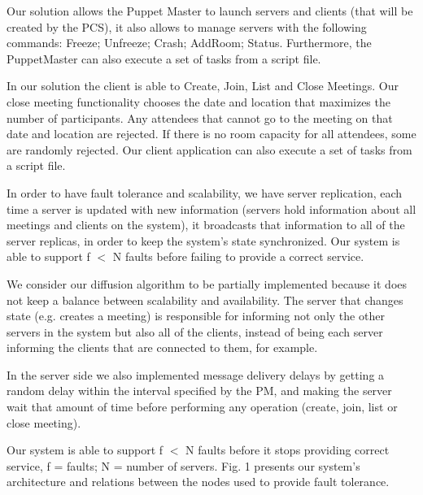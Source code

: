\documentclass[times, 10pt, twocolumn]{article}
\begin{document}

Our solution allows the Puppet Master to launch servers and clients (that will be created by the PCS), it also allows to manage servers with the following commands: Freeze; Unfreeze; Crash; AddRoom; Status.
Furthermore, the PuppetMaster can also execute a set of tasks from a script file.


In our solution the client is able to Create, Join, List and Close Meetings.
Our close meeting functionality chooses the date and location that maximizes the number of participants. Any attendees that cannot go to the meeting on that date and location are rejected. If there is no room capacity for all attendees, some are randomly rejected. Our client application can also execute a set of tasks from a script file.


In order to have fault tolerance and scalability, we have server replication, each time a server is updated with new information (servers hold information about all meetings and clients on the system), it broadcasts that information to all of the server replicas, in order to keep the system's state synchronized.
Our system is able to support f $<$ N faults before failing to provide a correct service.

We consider our diffusion algorithm to be partially implemented because it does not keep a balance between scalability and availability. The server that changes state (e.g. creates a meeting) is responsible for informing not only the other servers in the system but also all of the clients, instead of being each server informing the clients that are connected to them, for example.

In the server side we also implemented message delivery delays by getting a random delay within the interval specified by the PM, and making the server wait that amount of time before performing any operation (create, join, list or close meeting).

Our system is able to support f $<$ N faults before it stops providing correct service, f = faults; N = number of servers. Fig. 1 presents our system's architecture and relations between the nodes used to provide fault tolerance.
\end{document}
